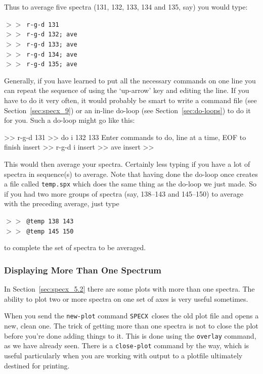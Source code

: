 \documentclass[11pt,twoside]{starlink}
\providecommand{\SPECX}{\texttt{SPECX}}
\providecommand{\SP}{{$>\!>$}}
\begin{document}
Thus to average five spectra (131, 132, 133, 134 and 135, say) you
would type:

\SP\ \texttt{r-g-d 131}\\
\SP\ \texttt{r-g-d 132; ave}\\
\SP\ \texttt{r-g-d 133; ave}\\
\SP\ \texttt{r-g-d 134; ave}\\
\SP\ \texttt{r-g-d 135; ave}

Generally, if you have learned to put all the necessary commands on
one line you can repeat the sequence of using the `up-arrow' key and
editing the line. If you have to do it very often, it would probably
be smart to write a command file (see Section~\ref{sec:specx_9}) or an
in-line do-loop (see Section~\ref{sec:do-loops}) to do it for
you. Such a do-loop might go like this:
\begin{terminalv}
>> r-g-d 131
>> do i 132 133
 Enter commands to do, line at a time, EOF to finish
 insert >> r-g-d i
 insert >> ave
 insert >>
\end{terminalv}
This would then average your spectra. Certainly less typing if you
have a lot of spectra in sequence(s) to average. Note that having done
the do-loop once creates a file called \texttt{temp.spx} which does the
same thing as the do-loop we just made. So if you had two more groups
of spectra (say, 138--143 and 145--150) to average with the preceding
average, just type

\SP\ \verb|@temp 138 143|\\
\SP\ \verb|@temp 145 150|

to complete the set of spectra to be averaged.

\subsubsection{Displaying More Than One Spectrum}
\label{sec:specx_8.3}
In Section~\ref{sec:specx_5.2} there are some plots with more than one
spectra. The ability to plot two or more spectra on one set of axes is
very useful sometimes.

When you send the \texttt{new-plot} command \SPECX\ closes the old plot
file and opens a new, clean one.  The trick of getting more than one
spectra is not to close the plot before you're done adding things to
it. This is done using the \texttt{overlay} command, as we have already
seen. There is a \texttt{close-plot} command by the way, which is useful
particularly when you are working with output to a plotfile ultimately
destined for printing.
\end{document}
